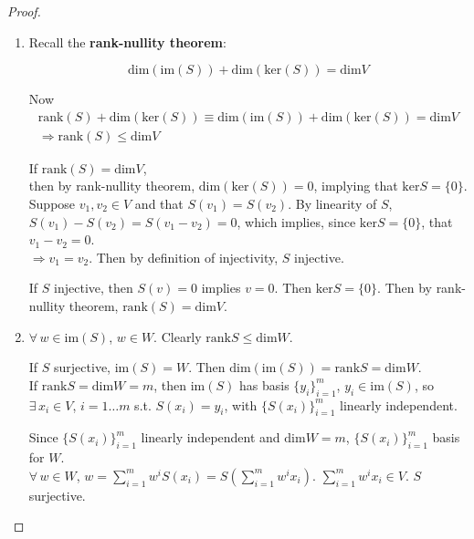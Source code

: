 \begin{proof}
	\begin{enumerate}
		\item[(a)] Recall the \textbf{rank-nullity theorem}:  
		\begin{theorem} 
\begin{equation}
\text{dim}(\text{im}(S)) + \text{dim}(\text{ker}(S)) = \text{dim}V  
\end{equation}			
			\end{theorem} 
		Now
		\[
		\begin{gathered}
		\text{rank}(S) + \text{dim}(\text{ker}(S)) \equiv \text{dim}(\text{im}(S)) + \text{dim}(\text{ker}(S)) = \text{dim}V  \\
\Longrightarrow \boxed{ 	\text{rank}(S) \leq \text{dim}V  }
\end{gathered}
		\]
		
		If $\text{rank}(S) = \text{dim}{V}$, \\
		then by rank-nullity theorem, $\text{dim}(\text{ker}(S)) = 0$, implying that $\text{ker}S = \lbrace 0 \rbrace$.  \\
		Suppose $v_1, v_2 \in V$ and that $S(v_1) = S(v_2) $.  By linearity of $S$, $S(v_1) - S(v_2) = S(v_1-v_2) = 0$, which implies, since $\text{ker}S = \lbrace 0 \rbrace$, that $v_1 - v_2 = 0$.  \\
		$\Longrightarrow v_1 = v_2$.  Then by definition of injectivity, $S$ injective.  
		
		If $S$ injective, then $S(v)=0$ implies $v=0$.  Then $\text{ker}S = \lbrace 0 \rbrace$.  Then by rank-nullity theorem, $\text{rank}(S) = \text{dim}{V}$.  
		
		\item[(b)] 		$\forall \, w \in \text{im}(S)$, $w\in W$.  Clearly $\text{rank}S \leq \text{dim}W$.  
		
		If $S$ surjective, $\text{im}(S) = W$.  Then $\text{dim}(\text{im}(S)) = \text{rank}S = \text{dim}W$.  \\
		
		If $\text{rank}S = \text{dim}W = m$, then $\text{im}(S)$ has basis $\lbrace y_i \rbrace_{i=1}^m$, $y_i \in \text{im}(S)$, so $\exists \, x_i \in V$, $i=1\dots m$ s.t. $S(x_i) = y_i$, with $\lbrace S(x_i) \rbrace_{i=1}^m $ linearly independent.  
		
		Since $\lbrace S(x_i) \rbrace_{i=1}^m$ linearly independent and $\text{dim}W = m$, $\lbrace S(x_i) \rbrace_{i=1}^m$ basis for $W$.   \\
		$\forall \, w \in W$, $w=\sum_{i=1}^m w^i S(x_i) = S(\sum_{i=1}^m w^i x_i)$.  $\sum_{i=1}^m w^i x_i \in V$.  $S$ surjective.  
		

\end{enumerate}
\end{proof}
